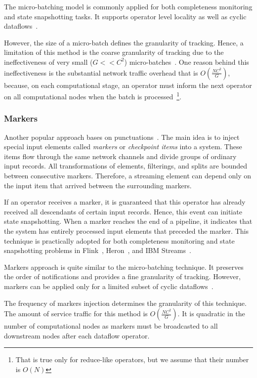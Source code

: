 The micro-batching model is commonly applied for both completeness monitoring and state snapshotting tasks.  It supports operator level locality as well as cyclic dataflows~\cite{meng2016mllib}. 

However, the size of a micro-batch defines the granularity of tracking. Hence, a limitation of this method is the coarse granularity of tracking due to the ineffectiveness of very small ($G << C^2$) micro-batches~\cite{Zaharia:2012:DSE:2342763.2342773}. One reason behind this ineffectiveness is the substantial network traffic overhead that is $O(\frac{NC^2}{G})$, because, on each computational stage, an operator must inform the next operator on all computational nodes when the batch is processed~\footnote{That is true only for reduce-like operators, but we assume that their number is $O(N)$}.

\subsubsection{Markers}

Another popular approach bases on punctuations~\cite{Tucker:2003:EPS:776752.776780}. The main idea is to inject special input elements called {\em markers} or {\em checkpoint items} into a system. These items flow through the same network channels and divide groups of ordinary input records. All transformations of elements, filterings, and splits are bounded between consecutive markers. Therefore, a streaming element can depend only on the input item that arrived between the surrounding markers. 

If an operator receives a marker, it is guaranteed that this operator has already received all descendants of certain input records. Hence, this event can initiate state snapshotting. When a marker reaches the end of a pipeline, it indicates that the system has entirely processed input elements that preceded the marker. This technique is practically adopted for both completeness monitoring and state snapshotting problems in Flink~\cite{Carbone:2017:SMA:3137765.3137777}, Heron~\cite{Kulkarni:2015:THS:2723372.2742788}, and IBM Streams~\cite{jacques2016consistent}. 

Markers approach is quite similar to the micro-batching technique. It preserves the order of notifications and provides a fine granularity of tracking. However, markers can be applied only for a limited subset of cyclic dataflows~\cite{carbone2018scalable}. 

The frequency of markers injection determines the granularity of this technique. The amount of service traffic for this method is $O(\frac{NC^2}{G})$. It is quadratic in the number of computational nodes as markers must be broadcasted to all downstream nodes after each dataflow operator. 

